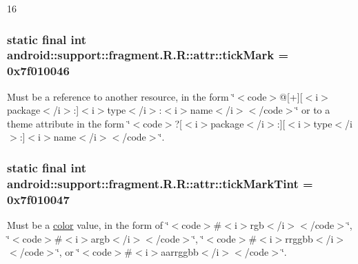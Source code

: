 16\hypertarget{classandroid_1_1support_1_1fragment_1_1_r_1_1attr_4b36f683fab310e1f59505a3a8cb5f0c}{
\subsubsection[{tickMark}]{\setlength{\rightskip}{0pt plus 5cm}static final int android::support::fragment.R.R::attr::tickMark = 0x7f010046}}
\label{classandroid_1_1support_1_1fragment_1_1_r_1_1attr_4b36f683fab310e1f59505a3a8cb5f0c}


Must be a reference to another resource, in the form \char`\"{}$<$code$>$@\mbox{[}+\mbox{]}\mbox{[}$<$i$>$package$<$/i$>$:\mbox{]}$<$i$>$type$<$/i$>$:$<$i$>$name$<$/i$>$$<$/code$>$\char`\"{} or to a theme attribute in the form \char`\"{}$<$code$>$?\mbox{[}$<$i$>$package$<$/i$>$:\mbox{]}\mbox{[}$<$i$>$type$<$/i$>$:\mbox{]}$<$i$>$name$<$/i$>$$<$/code$>$\char`\"{}. \hypertarget{classandroid_1_1support_1_1fragment_1_1_r_1_1attr_85e88f020a01b8c4ff1a0ec1e9c811eb}{
\subsubsection[{tickMarkTint}]{\setlength{\rightskip}{0pt plus 5cm}static final int android::support::fragment.R.R::attr::tickMarkTint = 0x7f010047}}
\label{classandroid_1_1support_1_1fragment_1_1_r_1_1attr_85e88f020a01b8c4ff1a0ec1e9c811eb}


Must be a \hyperlink{classandroid_1_1support_1_1fragment_1_1_r_1_1color}{color} value, in the form of \char`\"{}$<$code$>$\#$<$i$>$rgb$<$/i$>$$<$/code$>$\char`\"{}, \char`\"{}$<$code$>$\#$<$i$>$argb$<$/i$>$$<$/code$>$\char`\"{}, \char`\"{}$<$code$>$\#$<$i$>$rrggbb$<$/i$>$$<$/code$>$\char`\"{}, or \char`\"{}$<$code$>$\#$<$i$>$aarrggbb$<$/i$>$$<$/code$>$\char`\"{}. 

